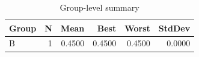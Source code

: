 \begin{table}[htbp]
\centering
\caption{Group-level summary}
\label{tab:group-summary}
\begin{tabular}{lrrrrr}
\toprule
\textbf{Group} & \textbf{N} & \textbf{Mean} & \textbf{Best} & \textbf{Worst} & \textbf{StdDev} \\
\midrule
B & 1 & 0.4500 & 0.4500 & 0.4500 & 0.0000 \\
\bottomrule
\end{tabular}
\end{table}